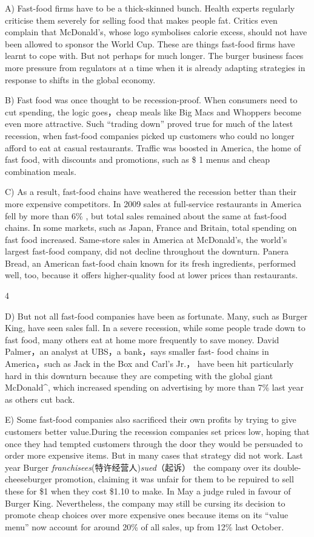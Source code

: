 \documentclass[UTF8,11pt]{ctexart}
\begin{document}
A) Fast-food firms have to be a thick-skinned bunch. Health experts regularly criticise them severely for selling food that makes people fat. Critics even complain that McDonald’s, whose logo symbolises calorie excess, should not have been allowed to sponsor the World Cup. These are things fast-food firms have learnt to cope with. But not perhaps for much longer. The burger business faces more pressure from regulators at a time when it is already adapting strategies in response to shifts in the global economy.


B) Fast food was once thought to be recession-proof. When consumers need to cut spending, the logic goes，cheap meals like Big Macs and Whoppers become even more attractive. Such “trading down” proved true for much of the latest recession, when fast-food companies picked up customers who could no longer afford to eat at casual restaurants. Traffic was boosted in America, the home of fast food, with discounts and promotions, such as \$ 1 menus and cheap combination meals.


C) As a result, fast-food chains have weathered the recession better than their more expensive competitors. In 2009 sales at full-service restaurants in America fell by more than 6\% , but total sales remained about the same at fast-food chains. In some markets, such as Japan, France and Britain, total spending on fast food increased. Same-store sales in America at McDonald’s, the world’s largest fast-food company, did not decline throughout the downturn. Panera Bread, an American fast-food chain known for its fresh ingredients, performed well, too, because it offers higher-quality food at lower prices than restaurants.


4


D) But not all fast-food companies have been as fortunate. Many, such as Burger King, have seen sales fall. In a severe recession, while some people trade down to fast food, many others eat at home more frequently to save money. David Palmer，an analyst at UBS，a bank，says smaller fast- food chains in America，such as Jack in the Box and Carl’s Jr.， have been hit particularly hard in this downturn because they are competing with the global giant McDonald\textasciicircum{}, which increased spending on advertising by more than 7\% last year as others cut back.


E) Some fast-food companies also sacrificed their own profits by trying to give customers better value.During the recession companies set prices low, hoping that once they had tempted customers through the door they would be persuaded to order more expensive items. But in many cases that strategy did not work. Last year Burger\textit{ franchisees}(特许经营人)\textit{sued}（起诉） the company over its double-cheeseburger promotion, claiming it was unfair for them to be repuired to sell these for \$1 when they cost \$1.10 to make. In May a judge ruled in favour of Burger King. Nevertheless, the company may still be cursing its decision to promote cheap choices over more expensive ones because items on its “value menu” now account for around 20\% of all sales, up from 12\% last October.
\end{document}
